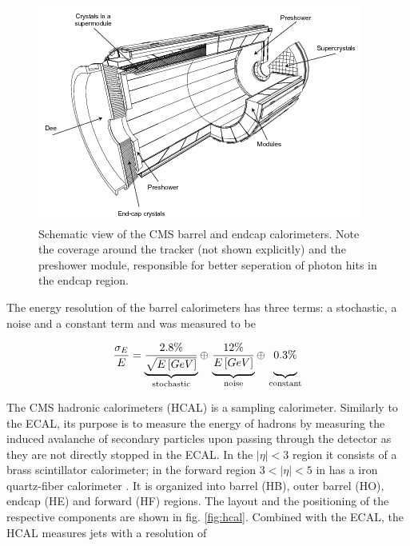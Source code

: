 \begin{figure}[h!]
	\centering
	\includegraphics[width=0.6\linewidth]{figures/experiment/ecal.png}
	\caption{Schematic view of the CMS barrel and endcap calorimeters. Note the coverage around the tracker (not shown explicitly) and the preshower module, responsible for better seperation of photon hits in the endcap region. \cite{Chatrchyan:1554142}}
	\label{fig:ecal}
\end{figure}

The energy resolution of the barrel calorimeters has three terms: a stochastic, a noise and a constant term and was measured to be \cite{Chatrchyan:1554142}

\begin{equation*}
	\frac{\sigma_E}{E} = \underbrace{\frac{2.8\%}{\sqrt{E\left[GeV\right]}}}_\text{stochastic} \oplus \, \underbrace{\vphantom{\frac{2.8\%}{\sqrt{E\left[GeV\right]}}}\frac{12\%}{E\left[GeV\right]}}_\text{noise} \oplus \, \underbrace{\vphantom{\frac{2.8\%}{\sqrt{E\left[GeV\right]}}}0.3\%}_\text{constant}
\end{equation*}



The CMS hadronic calorimeters (HCAL) is a sampling calorimeter. Similarly to the ECAL, its purpose is to measure the energy of hadrons by measuring the induced avalanche of secondary particles upon passing through the detector as they are not directly stopped in the ECAL. In the $|\eta|<3$ region it consists of a brass scintillator calorimeter; in the forward region $3<|\eta|<5$ in has a iron quartz-fiber calorimeter \cite{canko_ak_2009}. It is organized into barrel (HB), outer barrel (HO), endcap (HE) and forward (HF) regions. The layout and the positioning of the respective components are shown in fig. \ref{fig:hcal}. Combined with the ECAL, the HCAL measures jets with a resolution of \cite{Lopez}


